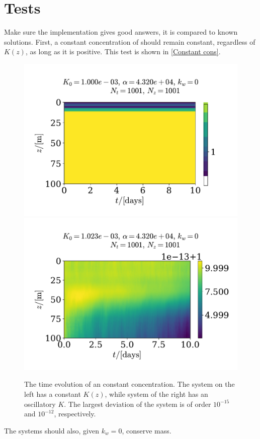 \documentclass{article}
\begin{document}
    \section*{Tests}
    Make sure the implementation gives good answers, it is compared to known solutions. First, a constant concentration of  should remain constant, regardless of $K(z)$, as long as it is positive. This test is shown in \autoref{Constant cons}. 

    \begin{figure}
        \centering
        \includegraphics[width=.49\textwidth]{../plots/test1}
        \includegraphics[width=.49\textwidth]{../plots/test1_varK}
        \label{Constant cons}
        \caption{The time evolution of an constant concentration. The system on the left has a constant $K(z)$, while system of the right has an oscillatory $K$. The largest deviation of the system is of order $10^{-15}$ and $10^{-12}$, respectively.}
    \end{figure}

    The systems should also, given $k_w=0$, conserve mass.
\end{document}
